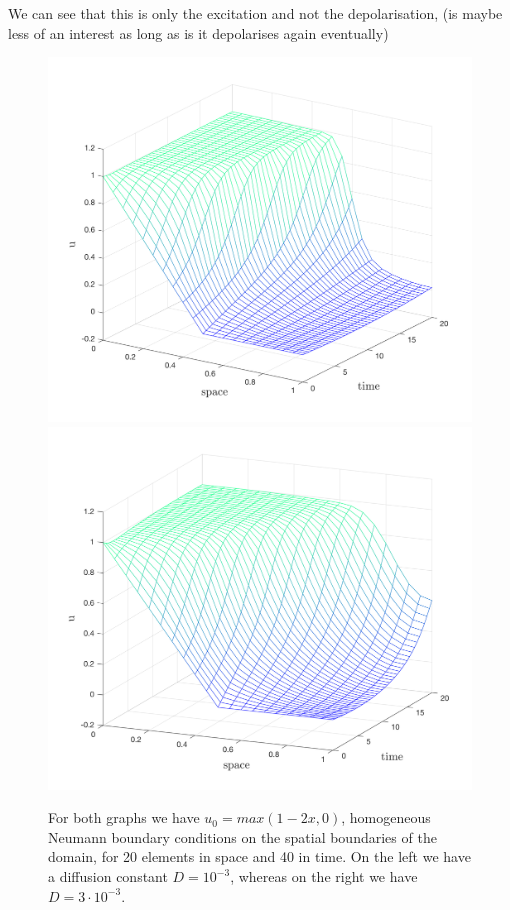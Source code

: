 \documentclass[../draft_1.tex]{subfiles}
\begin{document}
We can see that this is only the excitation and not the depolarisation, (is maybe less of an interest as long as is it depolarises again eventually)
\begin{figure}[ht!]
	\centering
	\includegraphics[scale=0.4]{images/implementation/sol_d0_001_1by20_20by40elem}
	\includegraphics[scale=0.4]{images/implementation/sol_d0_003_1by20_20by40elem}
	\caption{For both graphs we have $u_0 = max(1-2x, 0)$, homogeneous Neumann boundary conditions on the spatial boundaries of the domain, for 20 elements in space and 40 in time. On the left we have a diffusion constant $D= 10^{-3}$, whereas on the right we have $D=3 \cdot 10^{-3}$.}
\end{figure}
\end{document}

